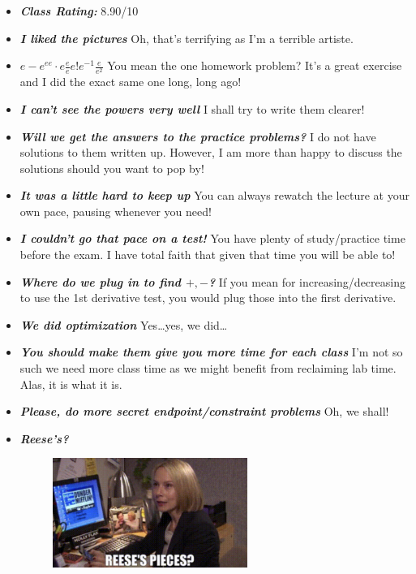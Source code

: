 \documentclass[11pt,letterpaper]{article}
\begin{document}
\begin{itemize}
\item {\bfseries\itshape Class Rating:} 8.90/10

\item {\bfseries\itshape I liked the pictures} Oh, that's terrifying as I'm a terrible artiste. 

\item {\bfseries\itshape $e - e^{ee} \cdot e \frac{e}{e} e! e^{-1} \frac{e}{e^2}$} You mean the one homework problem? It's a great exercise and I did the exact same one long, long ago!

\item {\bfseries\itshape I can't see the powers very well} I shall try to write them clearer!

\item {\bfseries\itshape Will we get the answers to the practice problems?} I do not have solutions to them written up. However, I am more than happy to discuss the solutions should you want to pop by!

\item {\bfseries\itshape It was a little hard to keep up} You can always rewatch the lecture at your own pace, pausing whenever you need!

\item {\bfseries\itshape I couldn't go that pace on a test!} You have plenty of study/practice time before the exam. I have total faith that given that time you will be able to!

\item {\bfseries\itshape Where do we plug in to find $+, -$?} If you mean for increasing/decreasing to use the 1st derivative test, you would plug those into the first derivative.

\item {\bfseries\itshape We did optimization} Yes\dots yes, we did\dots

\item {\bfseries\itshape You should make them give you more time for each class} I'm not so such we need more class time as we might benefit from reclaiming lab time. Alas, it is what it is. 

\item {\bfseries\itshape Please, do more secret endpoint/constraint problems} Oh, we shall!

\item {\bfseries\itshape Reese's?}
	\begin{figure}[H]
	\centering
	\includegraphics[width=0.60\textwidth]{images/pieces.png}
	\end{figure}
\end{itemize}
\end{document}
